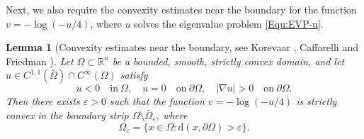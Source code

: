 \documentclass[11pt]{amsart}
\newtheorem{lemma}[theorem]{Lemma}
\numberwithin{theorem}{section}
\numberwithin{equation}{section}
\begin{document}
Next, we also require the convexity estimates near the boundary for the function $v=-\log(-u/4)$, where $u$ solves the eigenvalue problem \eqref{Equ:EVP-u}.
\begin{lemma}[Convexity estimates near the boundary, see Korevaar \cite{Korevaar1983}, Caffarelli and Friedman \cite{Caffarelli-Friedman1985}]\label{Lemma-BCE}
Let $\Omega\subset\mathbb{R}^n$ be a bounded, smooth, strictly convex domain, and let $u\in C^{1, 1}(\bar{\Omega})\cap C^{\infty}(\Omega)$ satisfy $$u<0\quad \mathrm{in}\ \Omega, \quad u=0\quad \mathrm{on}\ \partial\Omega, \quad |\nabla u|>0\quad \mathrm{on}\ \partial\Omega. $$ Then there exists $\varepsilon>0$ such that the function $v=-\log(-u/4)$ is strictly convex in the boundary strip $\Omega\setminus\bar{\Omega}_\varepsilon$, where
$$\Omega_\varepsilon=\{x\in\Omega: \mathrm{d}(x, \partial\Omega)>\varepsilon\}. $$
\end{lemma}
\end{document}
